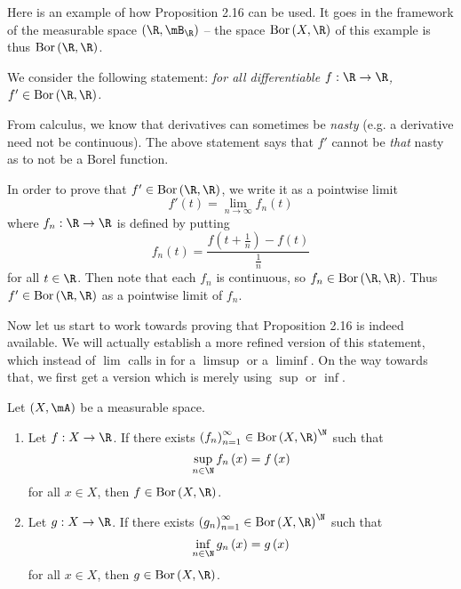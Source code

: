 \documentclass[pmath450]{subfiles}
\begin{document}
    \begin{example}{}
        Here is an example of how Proposition 2.16 can be used. It goes in the framework of the measurable space $\left( \R,\mB_{\R} \right)$ -- the space $\bor\left( X,\R \right)$ of this example is thus $\bor\left( \R,\R \right)$.
        
        We consider the following statement: \textit{for all differentiable $f:\R\to\R$, $f'\in\bor\left( \R,\R \right)$.}

        From calculus, we know that derivatives can sometimes be \textit{nasty} (e.g. a derivative need not be continuous). The above statement says that $f'$ cannot be \textit{that} nasty as to not be a Borel function.

        In order to prove that $f'\in\bor\left( \R,\R \right)$, we write it as a pointwise limit
        \begin{equation*}
            f'\left( t \right) = \lim_{n\to\infty} f_n\left( t \right)
        \end{equation*}
        where $f_n:\R\to\R$ is defined by putting
        \begin{equation*}
            f_n\left( t \right) = \frac{f\left( t+\frac{1}{n} \right)-f\left( t \right)}{\frac{1}{n}}
        \end{equation*}
        for all $t\in\R$. Then note that each $f_n$ is continuous, so $f_n\in\bor\left( \R,\R \right)$. Thus $f'\in\bor\left( \R,\R \right)$ as a pointwise limit of $f_n$.
    \end{example}

    \rruleline

    \np Now let us start to work towards proving that Proposition 2.16 is indeed available. We will actually establish a more refined version of this statement, which instead of $\lim$ calls in for a $\limsup$ or a $\liminf$. On the way towards that, we first get a version which is merely using $\sup$ or $\inf$.

    \begin{prop}{}
        Let $\left( X,\mA \right)$ be a measurable space.
        \begin{enumerate}
            \item Let $f:X\to\R$. If there exists $\left( f_{n} \right)^{\infty}_{n=1}\in\bor\left( X,\R \right)^{\N}$ such that
                \begin{equation*}
                    \sup_{n\in\N}f_n\left( x \right) = f\left( x \right)
                \end{equation*}
                for all $x\in X$, then $f\in\bor\left( X,\R \right)$.
            \item Let $g:X\to\R$. If there exists $\left( g_{n} \right)^{\infty}_{n=1}\in\bor\left( X,\R \right)^{\N}$ such that
                \begin{equation*}
                    \inf_{n\in\N}g_n\left( x \right) = g\left( x \right)
                \end{equation*}
                for all $x\in X$, then $g\in\bor\left( X,\R \right)$.
        \end{enumerate}
    \end{prop}
\end{document}

